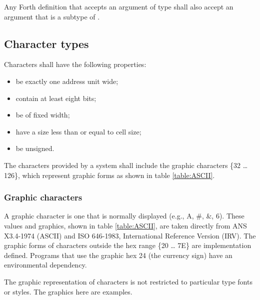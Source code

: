 Any Forth definition that accepts an argument of type 
shall also accept an argument that is a subtype of .

\pagebreak
\subsection{Character types} %
\label{usage:char}

Characters shall have the following properties:
\begin{itemize}
\item be exactly one address unit wide; \\[-4ex]
\item contain at least eight bits; \\[-4ex]
\item be of fixed width; \\[-4ex]
\item have a size less than or equal to cell size; \\[-4ex]
\item be unsigned.
\end{itemize}

The characters provided by a system shall include the graphic
characters \{32 {\ldots} 126\}, which represent graphic forms
as shown in table \ref{table:ASCII}.

\subsubsection{Graphic characters} %
\label{usage:ASCII}

A graphic character is one that is normally displayed (e.g.,
A, \#, \&, 6). These values and graphics, shown in table
\ref{table:ASCII}, are taken directly from ANS X3.4-1974 (ASCII)
and ISO 646-1983, International Reference Version (IRV). The
graphic forms of characters outside the hex range \{20 {\ldots}
7E\} are implementation defined. Programs that use the graphic hex
24 (the currency sign) have an environmental dependency.

The graphic representation of characters is not restricted to
particular type fonts or styles. The graphics here are examples.

